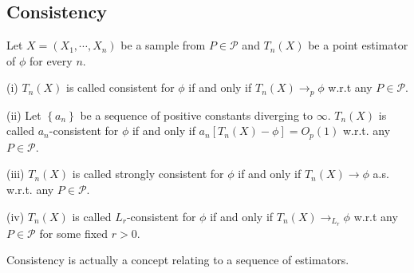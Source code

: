 \subsection{Consistency}
\begin{definition}
Let $X=(X_1,\cdots,X_n)$ be a sample from $P\in\mathcal{P}$ and $T_n(X)$ be a point estimator of $\phi$ for every $n$.\par
(i) $T_n(X)$ is called consistent for $\phi$ if and only if $T_n(X)\to_p\phi$ w.r.t any $P\in\mathcal{P}$.\par
(ii) Let $\left\{a_n\right\}$ be a sequence of positive constants diverging to $\infty$. $T_n(X)$ is called $a_n$-consistent for $\phi$ if and only if $a_n[T_n(X)-\phi]=O_p(1)$ w.r.t. any $P\in\mathcal{P}$.\par
(iii) $T_n(X)$ is called strongly consistent for $\phi$ if and only if $T_n(X)\to\phi$ a.s. w.r.t. any $P\in\mathcal{P}$.\par
(iv) $T_n(X)$ is called $L_r$-consistent for $\phi$ if and only if $T_n(X)\to_{L_r}\phi$ w.r.t any $P\in\mathcal{P}$ for some fixed $r>0$.
\end{definition}
\begin{remark}
Consistency is actually a concept relating to a sequence of estimators.
\end{remark}

